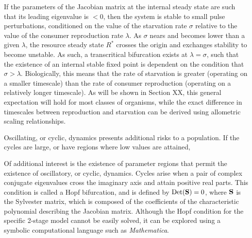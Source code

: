 \documentclass[11pt]{article}
\begin{document}
If the parameters of the Jacobian matrix at the internal steady state are such that its leading eigenvalue is $<0$, then the system is stable to small pulse perturbations, conditioned on the value of the starvation rate $\sigma$ relative to the value of the consumer reproduction rate $\lambda$.
As $\sigma$ nears and becomes lower than a given $\lambda$, the resource steady state $R^*$ crosses the origin and exchanges stability to become unstable.
As such, a transcritical bifurcation exists at $\lambda = \sigma$, such that the existence of an internal stable fixed point is dependent on the condition that $\sigma > \lambda$.
Biologically, this means that the rate of starvation is greater (operating on a smaller timescale) than the rate of consumer reproduction (operating on a relatively longer timescale).
As will be shown in Section XX, this general expectation will hold for most classes of organisms, while the exact difference in timescales between reproduction and starvation can be derived using allometric scaling relationships.


Oscillating, or cyclic, dynamics presents additional risks to a population.
If the cycles are large, or have regions where low values are attained, 

Of additional interest is the existence of parameter regions that permit the existence of oscillatory, or cyclic, dynamics.
Cycles arise when a pair of complex conjugate eigenvalues cross the imaginary axis and attain positive real parts.
This condition is called a Hopf bifurcation, and is defined by ${\rm Det}({\bf S}) = 0$, where $\bf S$ is the Sylvester matrix, which is composed of the coefficients of the characteristic polynomial describing the Jacobian matrix.
Although the Hopf condition for the specific 2-stage model cannot be easily solved, it can be explored using a symbolic computational language such as \emph{Mathematica}.


\end{document}
